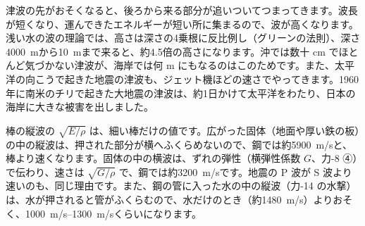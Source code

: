 \begin{phmijika}
津波の先がおそくなると、後ろから来る部分が追いついてつまってきます。波長が短くなり、運んできたエネルギーが短い所に集まるので、波が高くなります。浅い水の波の理論では、高さは深さの4乗根に反比例し（グリーンの法則）、深さ\qty{4000}{m}から\qty{10}{m}まで来ると、約4.5倍の高さになります。沖では数十 cm でほとんど気づかない津波が、海岸では何 m にもなるのはこのためです。また、太平洋の向こうで起きた地震の津波も、ジェット機ほどの速さでやってきます。1960年に南米のチリで起きた大地震の津波は、約1日かけて太平洋をわたり、日本の海岸に大きな被害を出しました。
\end{phmijika}

\begin{phflow}[媒質の運動方程式から波の速さへ]
\end{phflow}

\begin{phmodel}[棒・流体・浅い水の波]
\end{phmodel}

\begin{seikaku}
棒の縦波の $\sqrt{E/\rho}$ は、細い棒だけの値です。広がった固体（地面や厚い鉄の板）の中の縦波は、押された部分が横へふくらめないので、鋼では約\qty{5900}{m/s}と、棒より速くなります。固体の中の横波は、ずれの弾性（横弾性係数 $G$、力-8 ④）で伝わり、速さは $\sqrt{G/\rho}$ で、鋼では約\qty{3200}{m/s}です。地震の P 波が S 波より速いのも、同じ理由です。また、鋼の管に入った水の中の縦波（力-14 の水撃）は、水が押されると管がふくらむので、水だけのとき（約\qty{1480}{m/s}）よりおそく、\qtyrange{1000}{1300}{m/s}くらいになります。
\end{seikaku}

